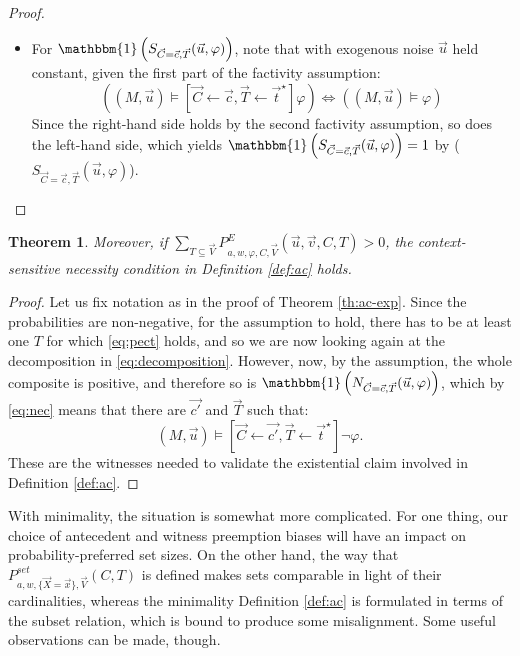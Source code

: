 \documentclass{article}
\newtheorem{theorem}{Theorem}
\begin{document}
\begin{proof}
\begin{itemize}
\item For $\mathbbm{1}\left(S_{\vec{C} = \vec{c}, \vec{T}}(\vec{u}, \varphi)\right)$,  note that with exogenous noise $\vec{u}$ held constant, given the first part of the factivity assumption:
\[\left( (M, \vec{u}) 
    \vDash [\vec{C} \leftarrow \vec{c}, \vec{T} \leftarrow \vec{t}^\star]\varphi \right) \Leftrightarrow \left( (M, \vec{u})\models \varphi\right) \] \noindent  Since the right-hand side holds by the second factivity assumption, so does the left-hand side, which yields $\mathbbm{1}\left(S_{\vec{C} = \vec{c}, \vec{T}}(\vec{u}, \varphi)\right) =1$ by ($S_{\vec{C} = \vec{c}, \vec{T}}(\vec{u}, \varphi)$).

\end{itemize}
\end{proof}




\begin{theorem} Moreover, if  
$\sum_{T \subseteq \vec{V}} P^{E}_{a, w, \varphi, C, \vec{V}}(\vec{u}, \vec{v}, C, T) > 0$,  the context-sensitive necessity condition in Definition \ref{def:ac} holds. \label{th:if_pr_then_nec}
\end{theorem}


\begin{proof} Let us fix notation as in the proof of Theorem \ref{th:ac-exp}.  Since the probabilities are non-negative, for the assumption to hold, there has to be at least one $T$ for which \eqref{eq:pect} holds, and so we are now looking again at the decomposition in \eqref{eq:decomposition}. However, now, by the assumption, the whole composite is positive, and therefore so is $\mathbbm{1}\left(N_{\vec{C} = \vec{c}, \vec{T}}(\vec{u}, \varphi)\right)$, which by \eqref{eq:nec} means that there are $\vec{c'}$ and $\vec{T}$ such that: 
\[
    (M, \vec{u}) \vDash [\vec{C} \leftarrow \vec{c'}, \vec{T} \leftarrow \vec{t}^\star]\neg \varphi.\] These are the witnesses needed to validate the existential claim involved in Definition \eqref{def:ac}.
\end{proof}


\pagebreak 


With minimality, the situation is somewhat more complicated. For one thing, our choice of antecedent and witness preemption biases will have an impact on probability-preferred set sizes. On the other hand, the way that \linebreak $P^{\mathit{set}}_{a,w, \{\vec{X}=\vec {x}\}, \vec{V}}(C,T)$ is defined makes sets comparable in light of their cardinalities, whereas the minimality Definition \ref{def:ac}  is formulated in terms of the subset relation, which is bound to produce some misalignment. Some useful observations can be made, though. 
\end{document}
